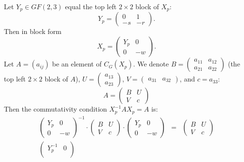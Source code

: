 \documentclass[11pt]{article} \usepackage{amssymb}
\begin{document}
\begin{enumerate}
\begin{enumerate}
\begin{itemize}
        Let $Y_p\in GF(2,3)$ equal the top left $2\times 2$ block of $X_p$:
        $$Y_p=\begin{pmatrix}0 &1\\-s&-r\end{pmatrix}.$$
        Then in block form
        $$X_p=\begin{pmatrix}Y_p &0\\0&-w\end{pmatrix}.$$
        Let $A=(a_{ij})$ be an element of $C_G(X_p)$. We denote 
        $B=
        \begin{pmatrix}
          a_{11}&a_{12}\\a_{21}&a_{22}
        \end{pmatrix}$ (the top 
        left $2\times 2$ block of $A$),  $U=\begin{pmatrix}a_{13}\\a_{23}\end{pmatrix}$,
        $V=\begin{pmatrix}a_{31}&a_{32}\end{pmatrix}$, and $c=a_{33}$:
        \begin{equation*}
          A=
          \begin{pmatrix}
            B &  U \\
            V &  c
          \end{pmatrix}
        \end{equation*}
        Then the commutativity condition $X_p^{-1}AX_p=A$ is:
        \begin{eqnarray*}
          \begin{pmatrix}
            Y_p&0\\
            0&-w
          \end{pmatrix}^{-1}
          \cdot
          \begin{pmatrix}
            B &  U \\
            V &  c
          \end{pmatrix}
          \cdot
          \begin{pmatrix}
            Y_p&0\\
            0&-w
          \end{pmatrix}
          &=&
          \begin{pmatrix}
            B &  U \\
            V &  c
          \end{pmatrix}\\
          \begin{pmatrix}
            Y_p^{-1}&0\\

\end{pmatrix}
\end{eqnarray*}
\end{itemize}
\end{enumerate}
\end{enumerate}
\end{document}
